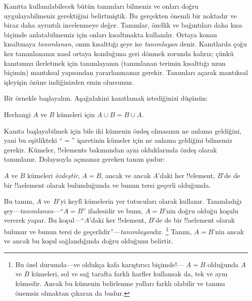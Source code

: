\documentclass[../../../include/open-logic-section]{subfiles}
\begin{document}


Kanıtta kullanılabilecek bütün tanımları bilmeniz ve onları doğru
uygulayabilmeniz gerektiğini belirtmiştik. Bu gerçekten önemli bir
noktadır ve biraz daha ayrıntılı incelenmeye değer. Tanımlar, özellik
ve bağıntıları daha kısa biçimde anlatabilmemiz için onları
kısaltmakta kullanılır. Ortaya konan kısaltmaya \emph{tanımlanan}, onun
kısalttığı şeye ise \emph{tanımlayan} denir. Kanıtlarda çoğu kez
tanımlananın nasıl ortaya konduğuna geri dönmek zorunda kalırız; çünkü
kanıtımızı ilerletmek için tanımlayanın (tanımlanan terimin kısalttığı
uzun biçimin) mantıksal yapısından yararlanmamız gerekir. Tanımları
açarak mantıksal işleyişin özüne indiğinizden emin olursunuz.

Bir örnekle başlayalım. Aşağıdakini kanıtlamak istediğinizi düşünün:

\begin{prop}
Herhangi $A$ ve $B$ kümeleri için $A \cup B = B \cup A$.
\end{prop}

Kanıta başlayabilmek için bile iki kümenin özdeş olmasının ne anlama
geldiğini, yani bu eşitlikteki ``$=$'' işaretinin kümeler için ne
anlama geldiğini bilmemiz gerekir. Kümeler, !!{element}s bakımından aynı
olduklarında özdeş olarak tanımlanır. Dolayısıyla açmamız gereken tanım
şudur:

\begin{defn}
$A$ ve $B$ kümeleri
\emph{özdeştir}, $A = B$, ancak ve ancak $A$'daki her !!{element},
$B$'de de bir !!a{element} olarak bulunduğunda ve bunun tersi geçerli
olduğunda.
\end{defn}

Bu tanım, $A$ ve~$B$'yi keyfî kümelerin yer tutucuları olarak kullanır.
Tanımladığı şey---\emph{tanımlanan}---``$A = B$'' ifadesidir ve bunu,
$A = B$'nin doğru olduğu koşulu vererek yapar. Bu koşul---``$A$'daki her
!!{element}, $B$'de de bir !!a{element} olarak bulunur ve bunun tersi de
geçerlidir''---\emph{tanımlayan}dır.
\footnote{Bu özel durumda---ve oldukça kafa karıştırıcı biçimde!---
  $A = B$ olduğunda $A$ ve $B$ kümeleri, sol ve sağ tarafta farklı
  harfler kullansak da, tek ve aynı kümedir. Ancak bu kümenin
  belirlenme yolları farklı olabilir ve tanımı önemsiz olmaktan
  çıkaran da budur.} Tanım, $A = B$'nin ancak ve ancak bu koşul
sağlandığında doğru olduğunu belirtir.
\end{document}
